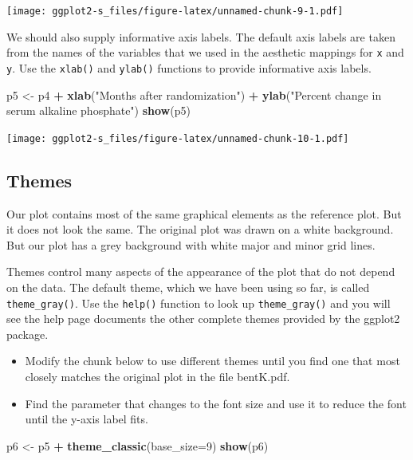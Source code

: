\documentclass[
]{book}
\newenvironment{Shaded}{\begin{snugshade}}{\end{snugshade}}
\newcommand{\AttributeTok}[1]{\textcolor[rgb]{0.13,0.29,0.53}{#1}}
\newcommand{\DecValTok}[1]{\textcolor[rgb]{0.00,0.00,0.81}{#1}}
\newcommand{\FunctionTok}[1]{\textcolor[rgb]{0.13,0.29,0.53}{\textbf{#1}}}
\newcommand{\NormalTok}[1]{#1}
\newcommand{\OtherTok}[1]{\textcolor[rgb]{0.56,0.35,0.01}{#1}}
\newcommand{\SpecialCharTok}[1]{\textcolor[rgb]{0.81,0.36,0.00}{\textbf{#1}}}
\newcommand{\StringTok}[1]{\textcolor[rgb]{0.31,0.60,0.02}{#1}}
\providecommand{\tightlist}{%
  \setlength{\itemsep}{0pt}\setlength{\parskip}{0pt}}
\begin{document}
\texttt{[image: ggplot2-s\_files/figure-latex/unnamed-chunk-9-1.pdf]}

We should also supply informative axis labels. The default axis labels are taken from the names of the variables that we used in the aesthetic mappings for \texttt{x} and \texttt{y}. Use the \texttt{xlab()} and \texttt{ylab()} functions to provide informative axis labels.

\begin{Shaded}
\begin{Highlighting}[]
\NormalTok{p5 }\OtherTok{\textless{}{-}}\NormalTok{ p4 }\SpecialCharTok{+} \FunctionTok{xlab}\NormalTok{(}\StringTok{"Months after randomization"}\NormalTok{) }\SpecialCharTok{+} 
  \FunctionTok{ylab}\NormalTok{(}\StringTok{"Percent change in serum alkaline phosphate"}\NormalTok{)}
\FunctionTok{show}\NormalTok{(p5)}
\end{Highlighting}
\end{Shaded}

\texttt{[image: ggplot2-s\_files/figure-latex/unnamed-chunk-10-1.pdf]}

\subsection{Themes}\label{themes}

Our plot contains most of the same graphical elements as the reference plot. But it does not look the same. The original plot was drawn on a white background. But our plot has a grey background with white major and minor grid lines.

Themes control many aspects of the appearance of the plot that do not depend on the data. The default theme, which we have been using so far, is called \texttt{theme\_gray()}. Use the \texttt{help()} function to look up \texttt{theme\_gray()} and you will see the help page documents the other complete themes provided by the ggplot2 package.

\begin{itemize}
\tightlist
\item
  Modify the chunk below to use different themes until you find one that most closely matches the original plot in the file bentK.pdf.
\item
  Find the parameter that changes to the font size and use it to reduce the font until the y-axis label fits.
\end{itemize}

\begin{Shaded}
\begin{Highlighting}[]
\NormalTok{p6 }\OtherTok{\textless{}{-}}\NormalTok{ p5 }\SpecialCharTok{+} \FunctionTok{theme\_classic}\NormalTok{(}\AttributeTok{base\_size=}\DecValTok{9}\NormalTok{)}
\FunctionTok{show}\NormalTok{(p6)}
\end{Highlighting}
\end{Shaded}
\end{document}
